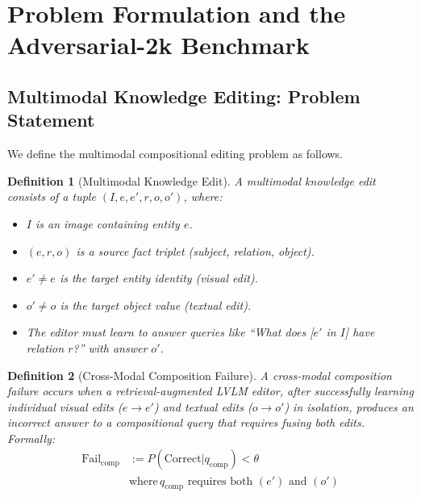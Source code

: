 \documentclass[11pt]{article}
\newtheorem{definition}{Definition}
\begin{document}
\section{Problem Formulation and the Adversarial-2k Benchmark}
\label{sec:problem}

\subsection{Multimodal Knowledge Editing: Problem Statement}
\label{sec:problem_formulation}

We define the multimodal compositional editing problem as follows.

\begin{definition}[Multimodal Knowledge Edit]
A \emph{multimodal knowledge edit} consists of a tuple $(I, e, e', r, o, o')$,
where:
\begin{itemize}
  \item $I$ is an image containing entity $e$.
  \item $(e, r, o)$ is a source fact triplet (subject, relation, object).
  \item $e' \neq e$ is the target entity identity (visual edit).
  \item $o' \neq o$ is the target object value (textual edit).
  \item The editor must learn to answer queries like ``What does [$e'$ in $I$]
    have relation $r$?'' with answer $o'$.
\end{itemize}
\end{definition}

\begin{definition}[Cross-Modal Composition Failure]
A \emph{cross-modal composition failure} occurs when a retrieval-augmented LVLM
editor, after successfully learning individual visual edits ($e \to e'$) and
textual edits ($o \to o'$) in isolation, produces an incorrect answer to a
compositional query that requires fusing \emph{both} edits. Formally:
\begin{align}
  \text{Fail}_{\text{comp}} &:= P(\text{Correct}|q_{\text{comp}}) < \theta \\
  &\text{where} \, q_{\text{comp}} \text{ requires both } (e') \text{ and } (o')
\end{align}
\end{definition}
\end{document}
